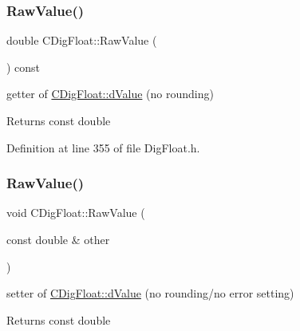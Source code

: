 \mbox{\label{classCDigFloat_acb435346b1f7b2e78d8f8373a416533a}} 
\subsubsection{\texorpdfstring{Raw\+Value()}{RawValue()}\hspace{0.1cm}{\footnotesize\ttfamily [1/2]}}
{\footnotesize\ttfamily double C\+Dig\+Float\+::\+Raw\+Value (\begin{DoxyParamCaption}{ }\end{DoxyParamCaption}) const\hspace{0.3cm}{\ttfamily [inline]}}



getter of \hyperlink{classCDigFloat_a4bbe69e30dd4e20527362493aa9aaf96}{C\+Dig\+Float\+::d\+Value} (no rounding) 

\begin{DoxyReturn}{Returns}
const double 
\end{DoxyReturn}


Definition at line 355 of file Dig\+Float.\+h.

\mbox{\label{classCDigFloat_a10dd39f19bfc21ae1d545d9203ef3e95}} 
\subsubsection{\texorpdfstring{Raw\+Value()}{RawValue()}\hspace{0.1cm}{\footnotesize\ttfamily [2/2]}}
{\footnotesize\ttfamily void C\+Dig\+Float\+::\+Raw\+Value (\begin{DoxyParamCaption}\item[{const double \&}]{other }\end{DoxyParamCaption})\hspace{0.3cm}{\ttfamily [inline]}}



setter of \hyperlink{classCDigFloat_a4bbe69e30dd4e20527362493aa9aaf96}{C\+Dig\+Float\+::d\+Value} (no rounding/no error setting) 

\begin{DoxyReturn}{Returns}
const double 
\end{DoxyReturn}


